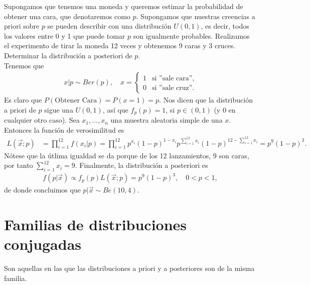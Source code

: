 \begin{ejemplo}
    Supongamos que tenemos una moneda y queremos estimar la probabilidad de obtener una cara, que denotaremos como $p$. Supongamos que nuestras creencias a priori sobre $p$ se pueden describir con una distribución $U(0,1)$, es decir, todos los valores entre 0 y 1 que puede tomar $p$ son igualmente probables. Realizamos el experimento de tirar la moneda 12 veces y obtenemos 9 caras y 3 cruces. Determinar la distribución a posteriori de $p$.
    \\
    \newline
    Tenemos que
    \begin{align*}
        x | p \sim Ber(p), \quad x = \begin{cases}
            1 & \text{si ''sale cara''}, \\
            0 & \text{si ''sale cruz''}.
        \end{cases}
    \end{align*}
    Es claro que $P(\text{Obtener Cara}) = P(x = 1) = p$. Nos dicen que la distribución a priori de $p$ sigue una $U(0,1)$, así que $f_p(p) = 1$, si $p \in (0,1)$ (y 0 en cualquier otro caso). Sea $x_1,...,x_n$ una muestra aleatoria simple de una $x$. Entonces la función de verosimilitud es
    \begin{align*}
        L(\vec{x};p) &= \prod_{i=1}^{12} f(x_i | p) = \prod_{i=1}^{12} p^{x_i}(1-p)^{1-x_i} p^{\sum_{i=1}^{12} x_i}(1-p)^{12 - \sum_{i=1}^{12} x_i} = p^9(1-p)^3.
    \end{align*}
    Nótese que la útlima igualdad se da porque de los 12 lanzamientos, 9 son caras, por tanto $\sum_{i=1}^{12} x_i = 9$. Finalmente, la distribución a posteriori es
    \begin{align*}
        f(p | \vec{x}) \propto f_p(p)L(\vec{x};p) = p^9(1-p)^3, \quad 0 < p < 1,
    \end{align*}
    de donde concluimos que $p | \vec{x} \sim Be(10,4)$.
\end{ejemplo}

\section{Familias de distribuciones conjugadas}
\noindent Son aquellas en las que las distribuciones a priori y a posteriores son de la misma familia.

